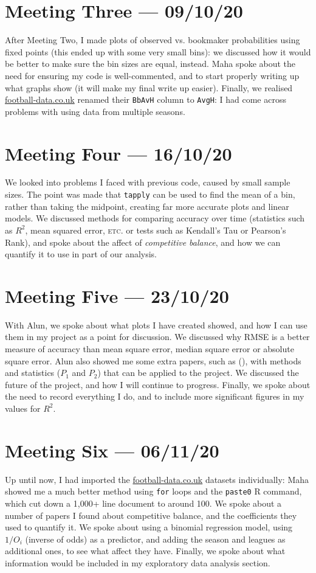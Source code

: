 \documentclass[a4paper,10pt]{report}
\begin{document}
\section*{Meeting Three --- 09/10/20}
After Meeting Two, I made plots of observed vs. bookmaker probabilities using fixed points (this ended up with some very small bins): we discussed how it would be better to make sure the bin sizes are equal, instead. Maha spoke about the need for ensuring my code is well-commented, and to start properly writing up what graphs show (it will make my final write up easier). Finally, we realised \url{football-data.co.uk} renamed their \lstinline|BbAvH| column to \lstinline|AvgH|: I had come across problems with using data from multiple seasons.

\section*{Meeting Four --- 16/10/20}
We looked into problems I faced with previous code, caused by small sample sizes. The point was made that \lstinline|tapply| can be used to find the mean of a bin, rather than taking the midpoint, creating far more accurate plots and linear models. We discussed methods for comparing accuracy over time (statistics such as $R^2$, mean squared error, \textsc{etc}. or tests such as Kendall's Tau or Pearson's Rank), and spoke about the affect of \textit{competitive balance}, and how we can quantify it to use in part of our analysis.

\section*{Meeting Five --- 23/10/20}
With Alun, we spoke about what plots I have created showed, and how I can use them in my project as a point for discussion. We discussed why RMSE is a better measure of accuracy than mean square error, median square error or absolute square error. Alun also showed me some extra papers, such as \citeauthor{Owen09} (\citeyear{Owen09}), with methods and statistics ($P_1$ and $P_2$) that can be applied to the project. We discussed the future of the project, and how I will continue to progress. Finally, we spoke about the need to record everything I do, and to include more significant figures in my values for $R^2$.

\section*{Meeting Six --- 06/11/20}
Up until now, I had imported the \url{football-data.co.uk} datasets individually: Maha showed me a much better method using \lstinline|for| loops and the \lstinline|paste0| R command, which cut down a 1,000+ line document to around 100. We spoke about a number of papers I found about competitive balance, and the coefficients they used to quantify it. We spoke about using a binomial regression model, using $1/{O_i}$ (inverse of odds) as a predictor, and adding the season and leagues as additional ones, to see what affect they have. Finally, we spoke about what information would be included in my exploratory data analysis section.
\end{document}
